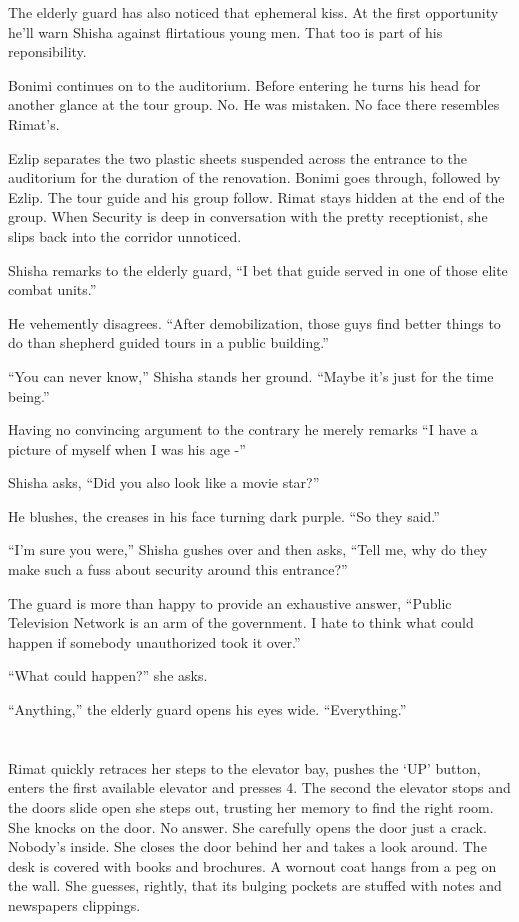 \documentclass[twoside,11pt]{book}
\begin{document}
The elderly guard has also noticed that ephemeral kiss. At the first opportunity he'll warn Shisha
against flirtatious young men. That too is part of his reponsibility.

Bonimi continues on to the auditorium. Before entering he turns his head for another glance at the tour group. No. He
was mistaken. No face there resembles Rimat's.

Ezlip separates the two plastic sheets suspended across the entrance to the auditorium for the duration of the
renovation. Bonimi goes through, followed by Ezlip. The tour guide and his group follow. Rimat stays hidden at the end
of the group. When Security is deep in conversation with the pretty receptionist, she slips back into the corridor
unnoticed.

Shisha remarks to the elderly guard, ``I bet that guide served in one of those elite combat
units.'' \

He vehemently disagrees. ``After demobilization, those guys find better things to do than shepherd guided
tours in a public building.''

``You can never know,'' Shisha stands her ground. ``Maybe it's just for the time
being.''

Having no convincing argument to the contrary he merely remarks ``I have a picture of myself when I was his
age -'' \

Shisha asks, ``Did you also look like a movie star?''

He blushes, the creases in his face turning dark purple. ``So they said.''

``I'm sure you were,'' Shisha gushes over and then asks, ``Tell me, why do they
make such a fuss about security around this entrance?''

The guard is more than happy to provide an exhaustive answer, ``Public Television Network is an arm of
the government. I hate to think what could happen if somebody unauthorized took it over.''

``What could happen?'' she asks.

``Anything,'' the elderly guard opens his eyes wide. ``Everything.''



\chapter{}

Rimat quickly retraces her steps to the elevator bay, pushes the `UP' button, enters the first available elevator and
presses 4. The second the elevator stops and the doors slide open she steps out, trusting her memory to find the right
room. She knocks on the door. No answer. She carefully opens the door just a crack. Nobody's inside. She closes the
door behind her and takes a look around. The desk is covered with books and brochures. A wornout coat hangs from a peg
on the wall. She guesses, rightly, that its bulging pockets are stuffed with notes and newspapers
clippings.
\end{document}
